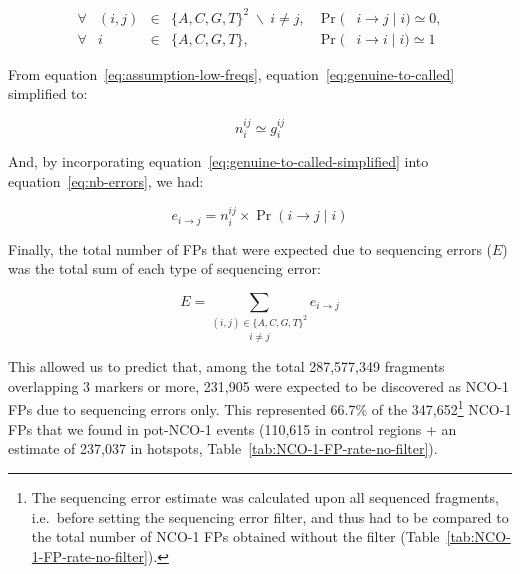 \begin{subequations} 
	\begin{alignat}{5}
		\forall &(i,j) &{}\in{}& \{A, C, G, T\}^2 \; \backslash \: i \neq j, &{}\Pr({}& i\rightarrow j \mid i ) \simeq 0,\label{eq:assumption-low-freqs}\\
		\forall &i	   &{}\in{}& \{A, C, G, T\},							 &{}\Pr({}& i\rightarrow i \mid i ) \simeq 1
	\end{alignat}
\end{subequations}


From equation~\ref{eq:assumption-low-freqs}, equation~\ref{eq:genuine-to-called} simplified to:

\begin{equation} \label{eq:genuine-to-called-simplified}
	n_{i}^{ij} \simeq g_{i}^{ij}
\end{equation}

And, by incorporating equation~\ref{eq:genuine-to-called-simplified} into equation~\ref{eq:nb-errors}, we had:

\begin{equation*} \label{eq:nb-errors-with-only-known-parameters}
	e_{i\rightarrow j} = n_{i}^{ij} \times \Pr( i\rightarrow j \mid i )
\end{equation*}


Finally, the total number of FPs that were expected due to sequencing errors ($E$) was the total sum of each type of sequencing error: 

\begin{equation*} \label{eq:sum-all-NCOs-expected}
	E = \underset{i \neq j} {\sum_{(i, j) \in \{A, C, G, T\}^2}} e_{i\rightarrow j}
\end{equation*}




This allowed us to predict that, among the total 287,577,349 fragments overlapping 3 markers or more, 231,905 were expected to be discovered as NCO-1 FPs due to sequencing errors only.
This represented 66.7\% of the 347,652\footnote{The sequencing error estimate was calculated upon all sequenced fragments, i.e.\ before setting the sequencing error filter, and thus had to be compared to the total number of NCO-1 FPs obtained without the filter (Table~\ref{tab:NCO-1-FP-rate-no-filter}).} NCO-1 FPs that we found in pot-NCO-1 events (110,615 in control regions + an estimate of 237,037 in hotspots, Table~\ref{tab:NCO-1-FP-rate-no-filter}).



